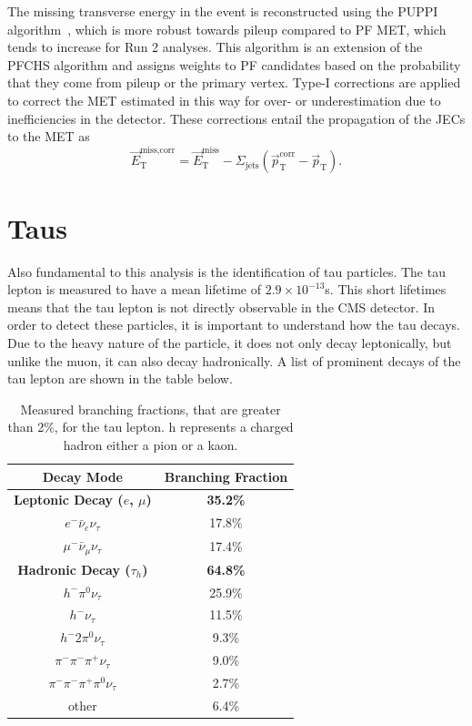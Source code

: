 The missing transverse energy in the event is reconstructed using the PUPPI algorithm~\cite{CMS-PAS-JME-18-001}, which is more robust towards pileup compared to PF MET, which tends to increase for Run 2 analyses. 
This algorithm is an extension of the PFCHS algorithm and assigns weights to PF candidates
based on the probability that they come from pileup or the primary vertex. Type-I corrections
are applied to correct the MET estimated in this way for over- or underestimation due to inefficiencies in the detector.
These corrections entail the propagation of the JECs to the MET as
\begin{equation}\label{eqn:met_t1corr} \vec{E}_{\text{T}}^{\text{miss,corr}} = \vec{E}_{\text{T}}^{\text{miss}} - \Sigma_{\text{jets}}(\vec{p}_{\text{T}}^{\text{corr}} - \vec{p}_{\text{T}}). \end{equation}


\section{Taus}

Also fundamental to this analysis is the identification of tau particles. The tau lepton is measured to have a mean lifetime of \(2.9 \times 10^{-13}\)s. This short lifetimes means that the tau lepton is not directly observable in the CMS detector.  In order to detect these particles, it is important to understand how the tau decays. Due to the heavy nature of the particle, it does not only decay leptonically, but unlike the muon, it can also decay hadronically. A list of prominent decays of the tau lepton are shown in the table below.

\begin{table}[h]
    \centering
    \begin{tabular}{|c|c|}
         \hline
         Decay Mode & Branching Fraction  \\
         \hline
         \hline
         \textbf{Leptonic Decay (\(e\), \(\mu\))} & \textbf{35.2\%} \\
         \(e^- \bar{\nu}_e \nu_\tau \) & 17.8\% \\
         \(\mu^- \bar{\nu}_\mu \nu_\tau \) & 17.4\% \\
         \hline
         \textbf{Hadronic Decay (\(\tau_h\))} & \textbf{64.8\%} \\
         \(h^- \pi^0 \nu_\tau \) & 25.9\% \\
         \(h^- \nu_\tau\) & 11.5\% \\
         \(h^- 2\pi^0 \nu_\tau\) & 9.3\% \\
         \(\pi^- \pi^- \pi^+ \nu_\tau\) & 9.0\% \\
         \(\pi^- \pi^- \pi^+ \pi^0 \nu_\tau\) & 2.7\% \\
         other & 6.4\% \\
         \hline
    \end{tabular}
    \caption{Measured branching fractions, that are greater than 2\%, for the tau lepton. h represents a charged hadron either a pion or a kaon.}
    \label{tab:tau_decay}
\end{table}

